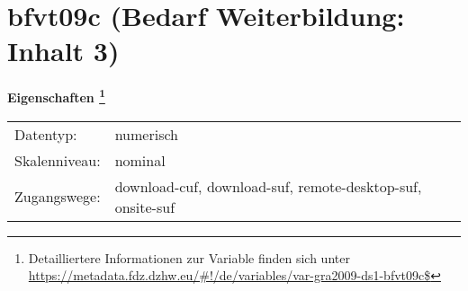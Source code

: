 
    \setcounter{footnote}{0}

    \vspace*{-1.8cm}
	\section{bfvt09c (Bedarf Weiterbildung: Inhalt 3)}
	\label{section:bfvt09c}



    \vspace*{0.5cm}
    \noindent\textbf{Eigenschaften
	\footnote{Detailliertere Informationen zur Variable finden sich unter
		\url{https://metadata.fdz.dzhw.eu/\#!/de/variables/var-gra2009-ds1-bfvt09c$}}}\\
	\begin{tabularx}{\hsize}{@{}lX}
	Datentyp: & numerisch \\
	Skalenniveau: & nominal \\
	Zugangswege: &
	  download-cuf, 
	  download-suf, 
	  remote-desktop-suf, 
	  onsite-suf
 \\
    \end{tabularx}



